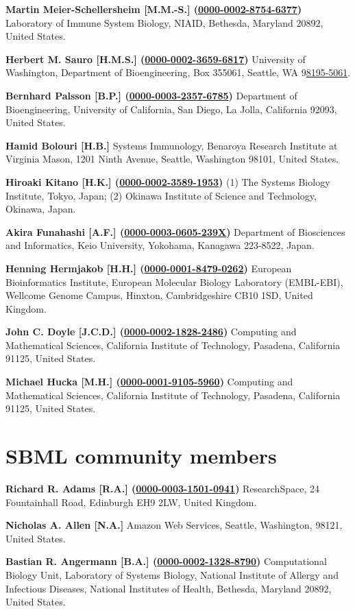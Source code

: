 \documentclass{sbml-paper}
\newcommand{\orcid}[1]{\href{https://orcid.org/#1}{#1}}
\begin{document}
\textbf{Martin Meier-Schellersheim [M.M.-S.] (\orcid{0000-0002-8754-6377})} Laboratory of Immune System Biology, NIAID, Bethesda, Maryland 20892, United States.

\textbf{Herbert M. Sauro [H.M.S.] (\orcid{0000-0002-3659-6817})} University of Washington, Department of Bioengineering, Box 355061, Seattle, WA 9\orcid{8195-5061}.

\textbf{Bernhard Palsson [B.P.] (\orcid{0000-0003-2357-6785})} Department of Bioengineering, University of California, San Diego, La Jolla, California 92093, United States.

\textbf{Hamid Bolouri [H.B.]} Systems Immunology, Benaroya Research Institute at Virginia Mason, 1201 Ninth Avenue, Seattle, Washington 98101, United States.

\textbf{Hiroaki Kitano [H.K.] (\orcid{0000-0002-3589-1953})} (1) The Systems Biology Institute, Tokyo, Japan; (2) Okinawa Institute of Science and Technology, Okinawa, Japan.

\textbf{Akira Funahashi [A.F.] (\orcid{0000-0003-0605-239X})} Department of Biosciences and Informatics, Keio University, Yokohama, Kanagawa 223-8522, Japan.

\textbf{Henning Hermjakob [H.H.] (\orcid{0000-0001-8479-0262})} European Bioinformatics Institute, European Molecular Biology Laboratory (EMBL-EBI), Wellcome Genome Campus, Hinxton, Cambridgeshire CB10 1SD, United Kingdom.

\textbf{John C. Doyle [J.C.D.] (\orcid{0000-0002-1828-2486})} Computing and Mathematical Sciences, California Institute of Technology, Pasadena, California 91125, United States.

\textbf{Michael Hucka [M.H.] (\orcid{0000-0001-9105-5960})} Computing and Mathematical Sciences, California Institute of Technology, Pasadena, California 91125, United States.


\clearpage
\section{SBML community members}

\textbf{Richard R. Adams [R.A.] (\orcid{0000-0003-1501-0941})} ResearchSpace, 24 Fountainhall Road, Edinburgh EH9 2LW, United Kingdom.

\textbf{Nicholas A. Allen [N.A.]} Amazon Web Services, Seattle, Washington, 98121, United States.

\textbf{Bastian R. Angermann [B.A.] (\orcid{0000-0002-1328-8790})} Computational Biology Unit, Laboratory of Systems Biology, National Institute of Allergy and Infectious Diseases, National Institutes of Health, Bethesda, Maryland 20892, United States.
\end{document}

